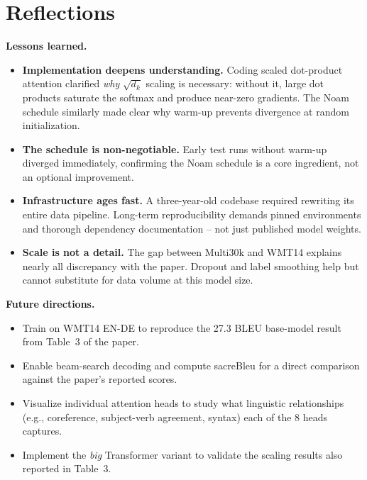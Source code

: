 \documentclass[10pt,twocolumn]{article}
\begin{document}
\section{Reflections}

\textbf{Lessons learned.}
\begin{itemize}
  \item \textbf{Implementation deepens understanding.} Coding scaled
    dot-product attention clarified \emph{why} $\sqrt{d_k}$ scaling is
    necessary: without it, large dot products saturate the softmax and
    produce near-zero gradients. The Noam schedule similarly made clear
    why warm-up prevents divergence at random initialization.
  \item \textbf{The schedule is non-negotiable.} Early test runs without
    warm-up diverged immediately, confirming the Noam schedule is a core
    ingredient, not an optional improvement.
  \item \textbf{Infrastructure ages fast.} A three-year-old codebase
    required rewriting its entire data pipeline. Long-term reproducibility
    demands pinned environments and thorough dependency documentation --
    not just published model weights.
  \item \textbf{Scale is not a detail.} The gap between Multi30k and WMT14
    explains nearly all discrepancy with the paper. Dropout and label
    smoothing help but cannot substitute for data volume at this model size.
\end{itemize}

\textbf{Future directions.}
\begin{itemize}
  \item Train on WMT14 EN-DE to reproduce the 27.3 BLEU base-model result
    from Table~3 of the paper.
  \item Enable beam-search decoding and compute sacreBleu for a direct
    comparison against the paper's reported scores.
  \item Visualize individual attention heads to study what linguistic
    relationships (e.g., coreference, subject-verb agreement, syntax) each
    of the 8 heads captures.
  \item Implement the \emph{big} Transformer variant to validate the
    scaling results also reported in Table~3.
\end{itemize}

\clearpage
\end{document}
